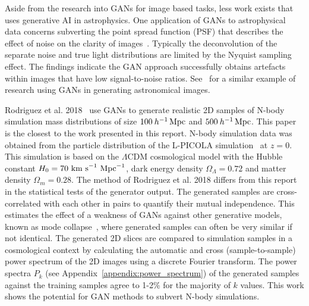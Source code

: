 \documentclass[twocolumn]{article}
\numberwithin{equation}{section}
\begin{document}
Aside from the research into GANs for image based tasks, less work exists that uses generative AI in astrophysics. One 
application of GANs to astrophysical data concerns subverting the point spread function (PSF) that describes the effect 
of noise on the clarity of images~\cite{gal_im_gen3}. Typically the deconvolution of the separate noise and true light 
distributions are limited by the Nyquist sampling effect. The findings indicate the GAN approach successfully obtains 
artefacts within images that have low signal-to-noise ratios. See~\cite{gal_im_gen2} for a similar example of research 
using GANs in generating astronomical images.

Rodriguez et al. 2018~\cite{web_gan} use GANs to generate realistic 2D samples of N-body simulation mass distributions 
of size $100 \: h^{-1} \,\textup{Mpc}$ and $500 \: h^{-1} \,\textup{Mpc}$. This paper is the closest to the work 
presented in this report. N-body simulation data was obtained from the particle distribution of the L-PICOLA 
simulation~\cite{LPICOLA} at $z=0$. This simulation is based on the $\Lambda \text{CDM}$ cosmological model with 
the Hubble constant $H_0=70\textup{ km s}^{-1}\textup{ Mpc}^{-1}$, dark energy density $\Omega_\Lambda=0.72$ and
matter density $\Omega_m=0.28$. The method of Rodriguez et al. 2018 differs from this report in the statistical 
tests of the generator output. The generated samples are cross-correlated with each other in pairs to quantify 
their mutual independence. This estimates the effect of a weakness of GANs against other generative models, known
as mode collapse~\cite{gf_gan}, where generated samples can often be very similar if not identical. The generated 
2D slices are compared to simulation samples in a cosmological context by calculating the automatic and cross 
(sample-to-sample) power spectrum of the 2D images using a discrete Fourier transform. The power spectra $P_k$ 
(see Appendix~\ref{appendix:power_spectrum}) of the generated samples against the training samples agree to 1-2\% 
for the majority of $k$ values. This work shows the potential for GAN methods to subvert N-body simulations. 
\end{document}
